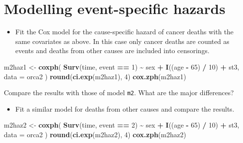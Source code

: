 \documentclass[
]{book}
\newenvironment{Shaded}{\begin{snugshade}}{\end{snugshade}}
\newcommand{\AttributeTok}[1]{\textcolor[rgb]{0.13,0.29,0.53}{#1}}
\newcommand{\DecValTok}[1]{\textcolor[rgb]{0.00,0.00,0.81}{#1}}
\newcommand{\FunctionTok}[1]{\textcolor[rgb]{0.13,0.29,0.53}{\textbf{#1}}}
\newcommand{\NormalTok}[1]{#1}
\newcommand{\OtherTok}[1]{\textcolor[rgb]{0.56,0.35,0.01}{#1}}
\newcommand{\SpecialCharTok}[1]{\textcolor[rgb]{0.81,0.36,0.00}{\textbf{#1}}}
\providecommand{\tightlist}{%
  \setlength{\itemsep}{0pt}\setlength{\parskip}{0pt}}
\begin{document}
\section{Modelling event-specific hazards}\label{modelling-event-specific-hazards}

\begin{itemize}
\tightlist
\item
  Fit the Cox model for the cause-specific hazard of cancer deaths
  with the same covariates as above. In this case
  only cancer deaths are counted as events and deaths from other causes
  are included into censorings.
\end{itemize}

\begin{Shaded}
\begin{Highlighting}[]
\NormalTok{m2haz1 }\OtherTok{\textless{}{-}} 
  \FunctionTok{coxph}\NormalTok{(}
    \FunctionTok{Surv}\NormalTok{(time, event }\SpecialCharTok{==} \DecValTok{1}\NormalTok{) }\SpecialCharTok{\textasciitilde{}}\NormalTok{ sex }\SpecialCharTok{+} \FunctionTok{I}\NormalTok{((age }\SpecialCharTok{{-}} \DecValTok{65}\NormalTok{) }\SpecialCharTok{/} \DecValTok{10}\NormalTok{) }\SpecialCharTok{+}\NormalTok{ st3, }
    \AttributeTok{data =}\NormalTok{ orca2}
\NormalTok{  )}
\FunctionTok{round}\NormalTok{(}\FunctionTok{ci.exp}\NormalTok{(m2haz1), }\DecValTok{4}\NormalTok{)}
\FunctionTok{cox.zph}\NormalTok{(m2haz1)}
\end{Highlighting}
\end{Shaded}

Compare the results with those of model \texttt{m2}. What are the major differences?

\begin{itemize}
\tightlist
\item
  Fit a similar model for deaths from other causes and compare the results.
\end{itemize}

\begin{Shaded}
\begin{Highlighting}[]
\NormalTok{m2haz2 }\OtherTok{\textless{}{-}} 
  \FunctionTok{coxph}\NormalTok{(}
    \FunctionTok{Surv}\NormalTok{(time, event }\SpecialCharTok{==} \DecValTok{2}\NormalTok{) }\SpecialCharTok{\textasciitilde{}}\NormalTok{ sex }\SpecialCharTok{+} \FunctionTok{I}\NormalTok{((age }\SpecialCharTok{{-}} \DecValTok{65}\NormalTok{) }\SpecialCharTok{/} \DecValTok{10}\NormalTok{) }\SpecialCharTok{+}\NormalTok{ st3, }
    \AttributeTok{data =}\NormalTok{ orca2}
\NormalTok{  )}
\FunctionTok{round}\NormalTok{(}\FunctionTok{ci.exp}\NormalTok{(m2haz2), }\DecValTok{4}\NormalTok{)}
\FunctionTok{cox.zph}\NormalTok{(m2haz2)}
\end{Highlighting}
\end{Shaded}
\end{document}
